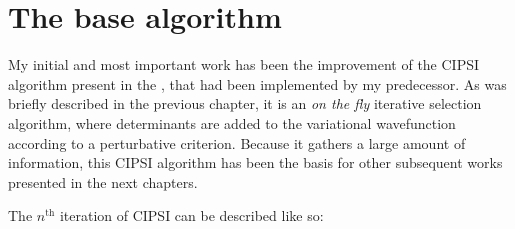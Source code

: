 \documentclass[./thesis.tex]{subfiles}
\begin{document}
\label{chap:CIPSI}


\section{The base algorithm}
My initial and most important work has been the improvement of the CIPSI algorithm present in the \QP, that had been implemented by my predecessor.\cite{giner:tel-01077016} As was briefly described in the previous chapter, it is an \emph{on the fly} iterative selection algorithm, where determinants are added to the variational wavefunction according to a perturbative criterion. Because it gathers a large amount of information, this CIPSI algorithm has been the basis for other subsequent works presented in the next chapters.

The $n^\text{th}$ iteration of CIPSI can be described like so:
\end{document}
